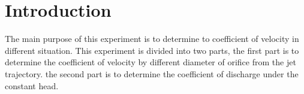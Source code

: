 \section{Introduction}
\label{sec:introduction}
\FloatBarrier %
The main purpose of this experiment is to determine to coefficient of velocity in different situation.
This experiment is divided into two parts, the first part is to determine the coefficient of 
velocity by different diameter of orifice from the jet trajectory.
the second part is to determine the coefficient of discharge under the constant head.
